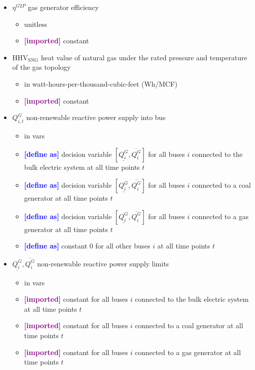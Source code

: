 \documentclass{article}
\newcommand{\lo}[1]{\underline{#1}}
\newcommand{\hi}[1]{\overline{#1}}
\newcommand{\define}{\textcolor{blue}{\textbf{[define as] }}}
\newcommand{\imported}{\textcolor{purple}{\textbf{[imported] }}}
\begin{document}
\begin{itemize}
\item $\eta^{G2P}$ gas generator efficiency
  \begin{itemize}
  \item unitless
  \item \imported constant
  \end{itemize}

\item $\text{HHV}_\text{SNG}$ heat value of natural gas under the rated pressure
  and temperature of the gas topology
  \begin{itemize}
  \item in watt-hours-per-thousand-cubic-feet (Wh/MCF)
  \item \imported constant
  \end{itemize}

\item $Q^G_{i,t}$ non-renewable reactive power supply into bus
  \begin{itemize}
  \item in vars

  \item \define decision variable $[\lo{Q^G_i}, \hi{Q^G_i}]$ for all buses $i$
    connected to the bulk electric system at all time points $t$

  \item \define decision variable $[\lo{Q^G_i}, \hi{Q^G_i}]$ for all buses $i$
    connected to a coal generator at all time points $t$

  \item \define decision variable $[\lo{Q^G_i}, \hi{Q^G_i}]$ for all buses $i$
    connected to a gas generator at all time points $t$

  \item \define constant $0$ for all other buses $i$ at all time points $t$

  \end{itemize}


\item $\lo{Q^G_i}, \hi{Q^G_i}$ non-renewable reactive power supply limits
  \begin{itemize}
  \item in vars
  \item \imported constant for all buses $i$ connected to the bulk electric
    system at all time points $t$
  \item \imported constant for all buses $i$ connected to a coal generator at
    all time points $t$
  \item \imported constant for all buses $i$ connected to a gas generator at all
    time points $t$
  \end{itemize}


\end{itemize}
\end{document}
